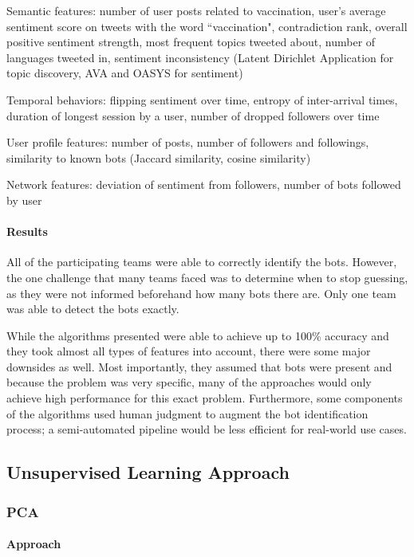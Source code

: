 \documentclass[11pt, oneside]{article}   	%
\begin{document}
Semantic features: number of user posts related to vaccination, user's average sentiment score on tweets with the word ``vaccination", contradiction rank, overall positive sentiment strength, most frequent topics tweeted about, number of languages tweeted in, sentiment inconsistency (Latent Dirichlet Application for topic discovery, AVA and OASYS for sentiment)

Temporal behaviors: flipping sentiment over time, entropy of inter-arrival times, duration of longest session by a user, number of dropped followers over time

User profile features: number of posts, number of followers and followings, similarity to known bots (Jaccard similarity, cosine similarity)

Network features: deviation of sentiment from followers, number of bots followed by user

\paragraph{Results}
\quad

\quad All of the participating teams were able to correctly identify the bots.
However, the one challenge that many teams faced was to determine when to stop guessing, as they were not informed beforehand how many bots there are.
Only one team was able to detect the bots exactly.

\quad While the algorithms presented were able to achieve up to 100\% accuracy and they took almost all types of features into account, there were some major downsides as well.
Most importantly, they assumed that bots were present and because the problem was very specific, many of the approaches would only achieve high performance for this exact problem.
Furthermore, some components of the algorithms used human judgment to augment the bot identification process; a semi-automated pipeline would be less efficient for real-world use cases.

\subsection{Unsupervised Learning Approach}
\subsubsection{PCA }

\paragraph{Approach}
\quad
\end{document}
